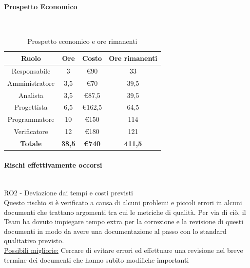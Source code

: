 \documentclass{article}
\begin{document}
                \paragraph{Prospetto Economico}\mbox{}\\
                \begin{table}[H]
                    \centering
                    \begin{tabular}{|c|c|c|c|}
                    \hline
                    \textbf{Ruolo}  & \textbf{Ore}  & \textbf{Costo} & \textbf{Ore rimanenti} \\ \hline
                    Responsabile    & 3             & €90            & 33                     \\ \hline
                    Amministratore  & 3,5           & €70            & 39,5                   \\ \hline
                    Analista        & 3,5           & €87,5          & 39,5                   \\ \hline
                    Progettista     & 6,5           & €162,5         & 64,5                   \\ \hline
                    Programmatore   & 10            & €150           & 114                    \\ \hline
                    Verificatore    & 12            & €180           & 121                    \\ \hline
                    \textbf{Totale} & \textbf{38,5} & \textbf{\euro740}   & \textbf{411,5}         \\ \hline
                    \end{tabular}
                    \caption{Prospetto economico e ore rimanenti}
                \end{table}


                \paragraph{Rischi effettivamente occorsi}\mbox{}\\
                RO2 - Deviazione dai tempi e costi previsti \\
                Questo rischio si è verificato a causa di alcuni problemi e piccoli errori in alcuni documenti che trattano argomenti tra cui le metriche di qualità. Per via di ciò, il Team ha dovuto impiegare tempo extra per la correzione e la revisione di questi documenti in modo da avere una documentazione al passo con lo standard qualitativo previsto. \\
                \underline{Possibili migliorie:} Cercare di evitare errori ed effettuare una revisione nel breve termine dei documenti che hanno subito modifiche importanti
\end{document}
